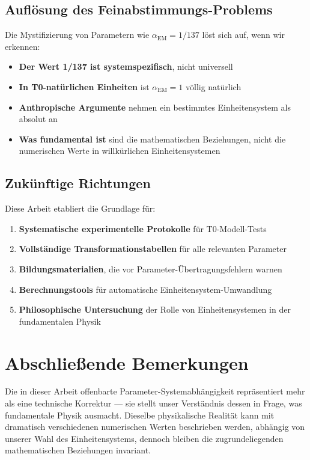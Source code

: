 \documentclass[12pt,a4paper]{article}
\begin{document}
	\subsection{Auflösung des Feinabstimmungs-Problems}
	\label{subsec:feinabstimmungs_aufloesung}
	
	Die Mystifizierung von Parametern wie $\alpha_{\text{EM}} = 1/137$ löst sich auf, wenn wir erkennen:
	
	\begin{itemize}
		\item \textbf{Der Wert 1/137 ist systemspezifisch}, nicht universell
		\item \textbf{In T0-natürlichen Einheiten} ist $\alpha_{\text{EM}} = 1$ völlig natürlich
		\item \textbf{Anthropische Argumente} nehmen ein bestimmtes Einheitensystem als absolut an
		\item \textbf{Was fundamental ist} sind die mathematischen Beziehungen, nicht die numerischen Werte in willkürlichen Einheitensystemen
	\end{itemize}
	
	\subsection{Zukünftige Richtungen}
	\label{subsec:zukuenftige_richtungen}
	
	Diese Arbeit etabliert die Grundlage für:
	
	\begin{enumerate}
		\item \textbf{Systematische experimentelle Protokolle} für T0-Modell-Tests
		\item \textbf{Vollständige Transformationstabellen} für alle relevanten Parameter
		\item \textbf{Bildungsmaterialien}, die vor Parameter-Übertragungsfehlern warnen
		\item \textbf{Berechnungstools} für automatische Einheitensystem-Umwandlung
		\item \textbf{Philosophische Untersuchung} der Rolle von Einheitensystemen in der fundamentalen Physik
	\end{enumerate}
	
	\section{Abschließende Bemerkungen}
	\label{sec:abschliessende_bemerkungen}
	
	Die in dieser Arbeit offenbarte Parameter-Systemabhängigkeit repräsentiert mehr als eine technische Korrektur --- sie stellt unser Verständnis dessen in Frage, was fundamentale Physik ausmacht. Dieselbe physikalische Realität kann mit dramatisch verschiedenen numerischen Werten beschrieben werden, abhängig von unserer Wahl des Einheitensystems, dennoch bleiben die zugrundeliegenden mathematischen Beziehungen invariant.
	
\end{document}

